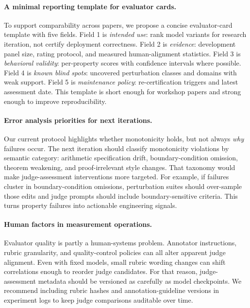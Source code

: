 \paragraph{A minimal reporting template for evaluator cards.}
To support comparability across papers, we propose a concise evaluator-card template with five fields.
Field 1 is \emph{intended use}: rank model variants for research iteration, not certify deployment correctness.
Field 2 is \emph{evidence}: development panel size, rating protocol, and measured human-alignment statistics.
Field 3 is \emph{behavioral validity}: per-property scores with confidence intervals where possible.
Field 4 is \emph{known blind spots}: uncovered perturbation classes and domains with weak support.
Field 5 is \emph{maintenance policy}: re-certification triggers and latest assessment date.
This template is short enough for workshop papers and strong enough to improve reproducibility.

\paragraph{Error analysis priorities for next iterations.}
Our current protocol highlights whether monotonicity holds, but not always \emph{why} failures occur.
The next iteration should classify monotonicity violations by semantic category:
arithmetic specification drift, boundary-condition omission, theorem weakening, and proof-irrelevant style changes.
That taxonomy would make judge-assessment interventions more targeted.
For example, if failures cluster in boundary-condition omissions, perturbation suites should over-sample those edits and judge prompts should include boundary-sensitive criteria.
This turns property failures into actionable engineering signals.

\paragraph{Human factors in measurement operations.}
Evaluator quality is partly a human-systems problem.
Annotator instructions, rubric granularity, and quality-control policies can all alter apparent judge alignment.
Even with fixed models, small rubric wording changes can shift correlations enough to reorder judge candidates.
For that reason, judge-assessment metadata should be versioned as carefully as model checkpoints.
We recommend including rubric hashes and annotation-guideline versions in experiment logs to keep judge comparisons auditable over time.

